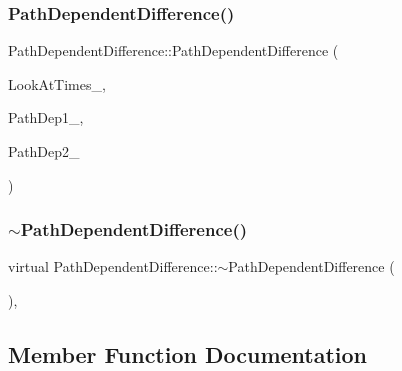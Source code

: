 \subsubsection{\texorpdfstring{Path\+Dependent\+Difference()}{PathDependentDifference()}}
{\footnotesize\ttfamily Path\+Dependent\+Difference\+::\+Path\+Dependent\+Difference (\begin{DoxyParamCaption}\item[{const \hyperlink{classMJArray}{M\+J\+Array} \&}]{Look\+At\+Times\+\_\+,  }\item[{\hyperlink{classWrapper}{Wrapper}$<$ \hyperlink{classPathDependent}{Path\+Dependent} $>$ \&}]{Path\+Dep1\+\_\+,  }\item[{\hyperlink{classWrapper}{Wrapper}$<$ \hyperlink{classPathDependent}{Path\+Dependent} $>$ \&}]{Path\+Dep2\+\_\+ }\end{DoxyParamCaption})}

\hypertarget{classPathDependentDifference_a2ab8a92f874f6e4ee36f0803f924b00c}{}\label{classPathDependentDifference_a2ab8a92f874f6e4ee36f0803f924b00c} 
\subsubsection{\texorpdfstring{$\sim$\+Path\+Dependent\+Difference()}{~PathDependentDifference()}}
{\footnotesize\ttfamily virtual Path\+Dependent\+Difference\+::$\sim$\+Path\+Dependent\+Difference (\begin{DoxyParamCaption}{ }\end{DoxyParamCaption})\hspace{0.3cm}{\ttfamily [inline]}, {\ttfamily [virtual]}}



\subsection{Member Function Documentation}
\hypertarget{classPathDependentDifference_a6e4daf07ddd8d11da86bf18684874d6a}{}\label{classPathDependentDifference_a6e4daf07ddd8d11da86bf18684874d6a} 
